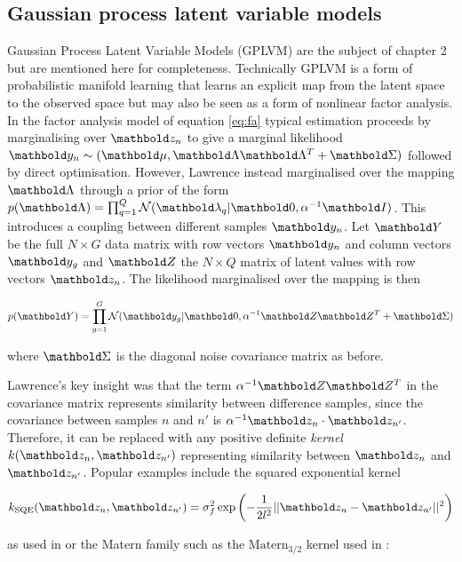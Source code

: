 \subsection{Gaussian process latent variable models} \label{sec:gplvm}

Gaussian Process Latent Variable Models (GPLVM) are the subject of chapter 2 but are mentioned here for completeness. Technically GPLVM is a form of probabilistic manifold learning that learns an explicit map from the latent space to the observed space but may also be seen as a form of nonlinear factor analysis. In the factor analysis model of equation \ref{eq:fa} typical estimation proceeds by marginalising over $\mbz_n$ to give a marginal likelihood $\mby_n \sim(\mbmu, \mbLambda \mbLambda^T + \mbSigma)$ followed by direct optimisation. However, Lawrence \cite{lawrence2004gaussian} instead marginalised over the mapping $\mbLambda$ through a prior of the form $p(\mbLambda) = \prod_{q=1}^Q \Norm(\mblambda_q | \mbzero, \alpha^{-1} \mbI)$. This introduces a coupling between different samples $\mby_n$. Let $\mbY$ be the full $N \times G$ data matrix with row vectors $\mby_n$ and column vectors $\mby_g$ and $\mbZ$ the $N \times Q$
matrix of latent values with row vectors $\mbz_n$. The likelihood marginalised over the mapping is then

\begin{equation}
  p(\mbY) = \prod_{g = 1}^G \norm(\mby_g | \mbzero, \alpha^{-1} \mbZ \mbZ^T + \mbSigma)
\end{equation}

where $\mbSigma$ is the diagonal noise covariance matrix as before.

Lawrence's key insight was that the term $\alpha^{-1} \mbZ \mbZ^T$ in the covariance matrix represents similarity between difference samples, since the covariance between samples $n$ and $n'$ is $\alpha^{-1} \mbz_n \cdot \mbz_{n'}$. Therefore, it can be replaced with any positive definite \emph{kernel} $k(\mbz_n, \mbz_{n'})$ representing similarity between $\mbz_n$ and $\mbz_{n'}$. Popular examples include the squared exponential kernel

\begin{equation}
k_{\text{SQE}}(\mbz_n, \mbz_{n'}) = \sigma_f^2 \exp\left(-\frac{1}{2l^2} \lvert \lvert \mbz_n - \mbz_{n'} \rvert\rvert^2\right)
\end{equation}

as used in \cite{campbell2016order} or the Matern family such as the $\text{Matern}_{3/2}$ kernel used in \cite{reid2016pseudotime}:

